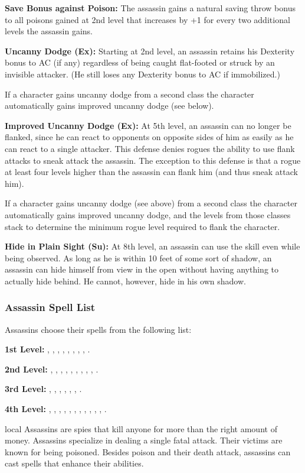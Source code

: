 {\textbf{Save Bonus against Poison:} The assassin gains a natural saving throw bonus to all poisons gained at 2nd level that increases by +1 for every two additional levels the assassin gains.

\textbf{Uncanny Dodge (Ex):} Starting at 2nd level, an assassin retains his Dexterity bonus to AC (if any) regardless of being caught flat-footed or struck by an invisible attacker. (He still loses any Dexterity bonus to AC if immobilized.)

If a character gains uncanny dodge from a second class the character automatically gains improved uncanny dodge (see below).

\textbf{Improved Uncanny Dodge (Ex):} At 5th level, an assassin can no longer be flanked, since he can react to opponents on opposite sides of him as easily as he can react to a single attacker. This defense denies rogues the ability to use flank attacks to sneak attack the assassin. The exception to this defense is that a rogue at least four levels higher than the assassin can flank him (and thus sneak attack him).

If a character gains uncanny dodge (see above) from a second class the character automatically gains improved uncanny dodge, and the levels from those classes stack to determine the minimum rogue level required to flank the character.

\textbf{Hide in Plain Sight (Su):} At 8th level, an assassin can use the  skill even while being observed. As long as he is within 10 feet of some sort of shadow, an assassin can hide himself from view in the open without having anything to actually hide behind. He cannot, however, hide in his own shadow.

\subsubsection{Assassin Spell List}
Assassins choose their spells from the following list:

\textbf{1st Level:} , , , , , , , , .

\textbf{2nd Level:} , , , , , , , , , .

\textbf{3rd Level:} ,  , , , , , .

\textbf{4th Level:} , , , , , , , , , , , .
}
{}
{local}
{Assassins are spies that kill anyone for more than the right amount of money.}
{Assassins specialize in dealing a single fatal attack. Their victims are known for being poisoned.}
{Besides poison and their death attack, assassins can cast spells that enhance their abilities.}